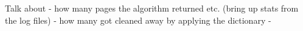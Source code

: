 Talk about 
- how many pages the algorithm returned etc. (bring up stats from the log files)
- how many got cleaned away by applying the dictionary 
- %
    

